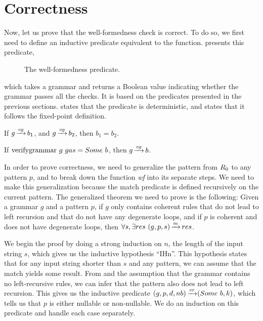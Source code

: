\section{Correctness}

Now, let us prove that the well-formedness check is correct.
To do so, we first need to define an
inductive predicate equivalent to
the \textit{\verifygrammarname{}} function.
presents this predicate,
\begin{figure}
    \centering
    
    \caption{The well-formedness predicate.}
    \label{fig:verifygrammar}
\end{figure}
which takes a grammar
and returns a Boolean value
indicating whether the grammar
passes all the checks.
It is based on the predicates
presented in the previous sections.
states that the predicate is deterministic,
and 
states that it follows the fixed-point definition.

\begin{lemma}
    \label{lemma:verifygrammar-determinism}
    If $g \operatorname{\xrightarrow{\mathit{vg}}} b_1$,
    and $g \operatorname{\xrightarrow{\mathit{vg}}} b_2$,
    then $b_1 = b_2$.
\end{lemma}

\begin{lemma}
    \label{lemma:verifygrammar-follows}
    If $\text{verifygrammar{}}\ g\ gas = Some\ b$,
    then $g \operatorname{\xrightarrow{\mathit{vg}}} b$.
\end{lemma}

In order to prove correctness,
we need to generalize the pattern from $R_{0}$
to any pattern $p$,
and to break down the function \textit{wf}
into its separate steps.
We need to make this generalization
because the match predicate is defined
recursively on the current pattern.
The generalized theorem we need to prove is the following:
Given a grammar $g$ and a pattern $p$,
if $g$ only contains coherent rules
that do not lead to left recursion
and that do not have any degenerate loops,
and if $p$ is coherent
and does not have degenerate loops,
then ${\forall s, \exists res\ \Matches{g}{p}{s}{res}}$.

We begin the proof by doing a strong induction on $n$,
the length of the input string $s$,
which gives us the inductive hypothesis ``IHn''.
This hypothesis states that for any input string shorter than $s$
and any pattern, we can assume that the match yields some result.
From 
and the assumption that the grammar contains no left-recursive rules,
we can infer that the pattern also does not lead to left recursion.
This gives us the inductive predicate
$(g,p,d,nb) \operatorname{\xrightarrow{\mathit{vr}}} (Some\ b,k)$,
which tells us that $p$ is either nullable or non-nullable.
We do an induction on this predicate
and handle each case separately.

